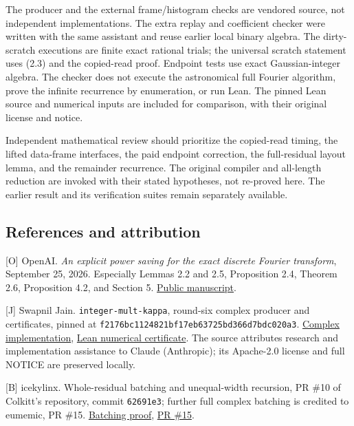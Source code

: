 \documentclass[
  11pt,
]{article}
\begin{document}
The producer and the external frame/histogram checks are vendored
source, not independent implementations. The extra replay and
coefficient checker were written with the same assistant and reuse
earlier local binary algebra. The dirty-scratch executions are finite
exact rational trials; the universal scratch statement uses (2.3) and
the copied-read proof. Endpoint tests use exact Gaussian-integer
algebra. The checker does not execute the astronomical full Fourier
algorithm, prove the infinite recurrence by enumeration, or run Lean.
The pinned Lean source and numerical inputs are included for comparison,
with their original license and notice.

Independent mathematical review should prioritize the copied-read
timing, the lifted data-frame interfaces, the paid endpoint correction,
the full-residual layout lemma, and the remainder recurrence. The
original compiler and all-length reduction are invoked with their stated
hypotheses, not re-proved here. The earlier result and its verification
suites remain separately available.

\subsection{References and
attribution}\label{references-and-attribution}

{[}O{]} OpenAI. \emph{An explicit power saving for the exact discrete
Fourier transform}, September 25, 2026. Especially Lemmas 2.2 and 2.5,
Proposition 2.4, Theorem 2.6, Proposition 4.2, and Section 5.
\href{https://github.com/openai/math/blob/main/preprints/An-explicit-power-saving-for-the-exact-discrete-Fourier-transform-September-25-2026/main.pdf}{Public
manuscript}.

{[}J{]} Swapnil Jain. \texttt{integer-mult-kappa}, round-six complex
producer and certificates, pinned at
\texttt{f2176bc1124821bf17eb63725bd366d7bdc020a3}.
\href{https://github.com/Swapnil-jain/integer-mult-kappa/tree/f2176bc1124821bf17eb63725bd366d7bdc020a3/independent/complex-twostage}{Complex
implementation},
\href{https://github.com/Swapnil-jain/integer-mult-kappa/blob/f2176bc1124821bf17eb63725bd366d7bdc020a3/lean/Round6.lean}{Lean
numerical certificate}. The source attributes research and
implementation assistance to Claude (Anthropic); its Apache-2.0 license
and full NOTICE are preserved locally.

{[}B{]} icekylinx. Whole-residual batching and unequal-width recursion,
PR \#10 of Colkitt's repository, commit \texttt{62691e3}; further full
complex batching is credited to eumemic, PR \#15.
\href{https://github.com/icekylinx/integer-mult-bounds/blob/62691e3/notes/batched-complex-rows.tex}{Batching
proof},
\href{https://github.com/CrocSwap/integer-mult-bounds/pull/15}{PR \#15}.
\end{document}
